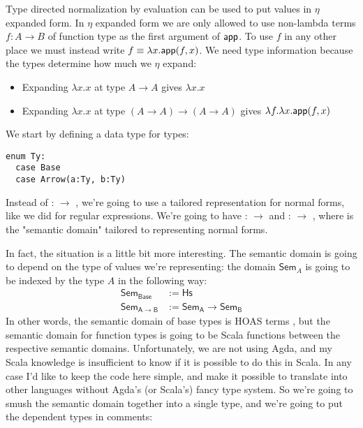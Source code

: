 Type directed normalization by evaluation can be used to put values in $\eta$ expanded form.
In $\eta$ expanded form we are only allowed to use non-lambda terms $f : A \to B$ of function type as the first argument of $\mathsf{app}$.
To use $f$ in any other place we must instead write $f \equiv \lambda x. \mathsf{app}(f,x)$.
We need type information because the types determine how much we $\eta$ expand:
\begin{itemize}
  \item Expanding $\lambda x. x$ at type $A \to A$ gives $\lambda x. x$
  \item Expanding $\lambda x. x$ at type $(A \to A) \to (A \to A)$ gives $\lambda f. \lambda x. \mathsf{app}(f,x)$
\end{itemize}

We start by defining a data type for types:

\begin{lstlisting}
enum Ty:
  case Base
  case Arrow(a:Ty, b:Ty)
\end{lstlisting}

Instead of  :  $\to$ , we're going to use a tailored representation for normal forms, like we did for regular expressions.
We're going to have  :  $\to$  and  :  $\to$ , where  is the "semantic domain" tailored to representing normal forms.

In fact, the situation is a little bit more interesting.
The semantic domain is going to depend on the type of values we're representing: the domain $\mathsf{Sem}_A$ is going to be indexed by the type $A$ in the following way:
\begin{align*}
  \mathsf{Sem}_\mathsf{Base} &:= \mathsf{Hs} \\
  \mathsf{Sem}_{\mathsf{A} \to \mathsf{B}} &:= \mathsf{Sem}_\mathsf{A} \to \mathsf{Sem}_\mathsf{B}
\end{align*}
In other words, the semantic domain of base types is HOAS terms , but the semantic domain for function types is going to be Scala functions between the respective semantic domains.
Unfortunately, we are not using Agda, and my Scala knowledge is insufficient to know if it is possible to do this in Scala.
In any case I'd like to keep the code here simple, and make it possible to translate into other languages without Agda's (or Scala's) fancy type system.
So we're going to smush the semantic domain together into a single type, and we're going to put the dependent types in comments:

